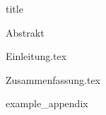 \documentclass{article}
\begin{document}
    {title}

    \frontmatter

    {Abstrakt}
    \newpage

    \tableofcontents


    \mainmatter

    {Einleitung.tex}

    {Zusammenfassung.tex}

    \newpage
    \printbibliography[heading = bibintoc, title = Bibliography]    %

    \addappendix
    {example_appendix}
    \newpage

\end{document}
